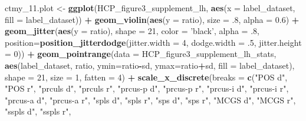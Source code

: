 \documentclass[
]{article}
\newenvironment{Shaded}{\begin{snugshade}}{\end{snugshade}}
\newcommand{\DataTypeTok}[1]{\textcolor[rgb]{0.13,0.29,0.53}{#1}}
\newcommand{\DecValTok}[1]{\textcolor[rgb]{0.00,0.00,0.81}{#1}}
\newcommand{\FloatTok}[1]{\textcolor[rgb]{0.00,0.00,0.81}{#1}}
\newcommand{\KeywordTok}[1]{\textcolor[rgb]{0.13,0.29,0.53}{\textbf{#1}}}
\newcommand{\NormalTok}[1]{#1}
\newcommand{\OperatorTok}[1]{\textcolor[rgb]{0.81,0.36,0.00}{\textbf{#1}}}
\newcommand{\StringTok}[1]{\textcolor[rgb]{0.31,0.60,0.02}{#1}}
\begin{document}
\begin{Shaded}
\begin{Highlighting}[]
\NormalTok{ctmy_}\FloatTok{11.}\NormalTok{plot <-}\StringTok{ }\KeywordTok{ggplot}\NormalTok{(HCP_figure3_supplement_lh, }\KeywordTok{aes}\NormalTok{(}\DataTypeTok{x =}\NormalTok{ label_dataset, }\DataTypeTok{fill =}\NormalTok{ label_dataset)) }\OperatorTok{+}\StringTok{ }
\StringTok{  }\KeywordTok{geom_violin}\NormalTok{(}\KeywordTok{aes}\NormalTok{(}\DataTypeTok{y =}\NormalTok{ ratio), }\DataTypeTok{size =} \FloatTok{.8}\NormalTok{, }\DataTypeTok{alpha =} \FloatTok{0.6}\NormalTok{) }\OperatorTok{+}\StringTok{ }
\StringTok{  }\KeywordTok{geom_jitter}\NormalTok{(}\KeywordTok{aes}\NormalTok{(}\DataTypeTok{y =}\NormalTok{ ratio), }
              \DataTypeTok{shape =} \DecValTok{21}\NormalTok{, }\DataTypeTok{color =} \StringTok{'black'}\NormalTok{, }\DataTypeTok{alpha =} \FloatTok{.8}\NormalTok{,}
              \DataTypeTok{position=}\KeywordTok{position_jitterdodge}\NormalTok{(}\DataTypeTok{jitter.width =} \DecValTok{4}\NormalTok{, }
                                            \DataTypeTok{dodge.width =} \FloatTok{.5}\NormalTok{, }\DataTypeTok{jitter.height =} \DecValTok{0}\NormalTok{)) }\OperatorTok{+}\StringTok{ }
\StringTok{  }\KeywordTok{geom_pointrange}\NormalTok{(}\DataTypeTok{data =}\NormalTok{ HCP_figure3_supplement_lh_stats, }
                  \KeywordTok{aes}\NormalTok{(label_dataset, ratio, }\DataTypeTok{ymin=}\NormalTok{ratio}\OperatorTok{-}\NormalTok{sd, }\DataTypeTok{ymax=}\NormalTok{ratio}\OperatorTok{+}\NormalTok{sd, }
                      \DataTypeTok{fill =}\NormalTok{ label_dataset), }
                  \DataTypeTok{shape =} \DecValTok{21}\NormalTok{, }\DataTypeTok{size =} \DecValTok{1}\NormalTok{, }\DataTypeTok{fatten =} \DecValTok{4}\NormalTok{) }\OperatorTok{+}
\StringTok{  }\KeywordTok{scale_x_discrete}\NormalTok{(}\DataTypeTok{breaks =} \KeywordTok{c}\NormalTok{(}\StringTok{"POS d"}\NormalTok{, }\StringTok{"POS r"}\NormalTok{,}
                              \StringTok{"prculs d"}\NormalTok{, }\StringTok{"prculs r"}\NormalTok{,}
                   \StringTok{"prcus-p d"}\NormalTok{, }\StringTok{"prcus-p r"}\NormalTok{,}
                   \StringTok{"prcus-i d"}\NormalTok{, }\StringTok{"prcus-i r"}\NormalTok{,}
                   \StringTok{"prcus-a d"}\NormalTok{, }\StringTok{"prcus-a r"}\NormalTok{,}
                   \StringTok{"spls d"}\NormalTok{, }\StringTok{"spls r"}\NormalTok{,}
                   \StringTok{"sps d"}\NormalTok{, }\StringTok{"sps r"}\NormalTok{,}
                   \StringTok{"MCGS d"}\NormalTok{, }\StringTok{"MCGS r"}\NormalTok{, }
                   \StringTok{"sspls d"}\NormalTok{, }\StringTok{"sspls r"}\NormalTok{,}

\end{Highlighting}
\end{Shaded}
\end{document}
